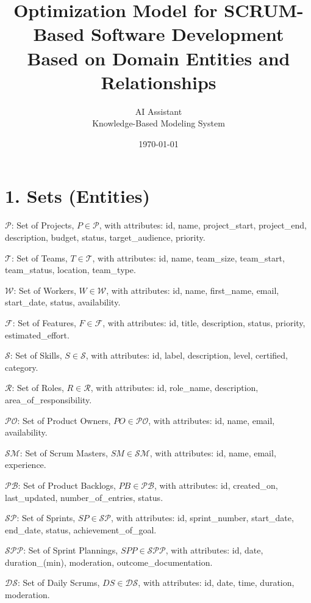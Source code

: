 \documentclass[12pt]{article}
\title{\Huge Optimization Model for SCRUM-Based Software Development \\ \Large Based on Domain Entities and Relationships}
\author{\Large AI Assistant \\ \normalsize Knowledge-Based Modeling System}
\date{\today}
\begin{document}
\maketitle
\tableofcontents
\newpage

\section{1. Sets (Entities)}
\item $ \mathcal{P} $: Set of Projects, $ P \in \mathcal{P} $, with attributes: id, name, project\_start, project\_end, description, budget, status, target\_audience, priority.
    \item $ \mathcal{T} $: Set of Teams, $ T \in \mathcal{T} $, with attributes: id, name, team\_size, team\_start, team\_status, location, team\_type.
    \item $ \mathcal{W} $: Set of Workers, $ W \in \mathcal{W} $, with attributes: id, name, first\_name, email, start\_date, status, availability.
    \item $ \mathcal{F} $: Set of Features, $ F \in \mathcal{F} $, with attributes: id, title, description, status, priority, estimated\_effort.
    \item $ \mathcal{S} $: Set of Skills, $ S \in \mathcal{S} $, with attributes: id, label, description, level, certified, category.
    \item $ \mathcal{R} $: Set of Roles, $ R \in \mathcal{R} $, with attributes: id, role\_name, description, area\_of\_responsibility.
    \item $ \mathcal{PO} $: Set of Product Owners, $ PO \in \mathcal{PO} $, with attributes: id, name, email, availability.
    \item $ \mathcal{SM} $: Set of Scrum Masters, $ SM \in \mathcal{SM} $, with attributes: id, name, email, experience.
    \item $ \mathcal{PB} $: Set of Product Backlogs, $ PB \in \mathcal{PB} $, with attributes: id, created\_on, last\_updated, number\_of\_entries, status.
    \item $ \mathcal{SP} $: Set of Sprints, $ SP \in \mathcal{SP} $, with attributes: id, sprint\_number, start\_date, end\_date, status, achievement\_of\_goal.
    \item $ \mathcal{SPP} $: Set of Sprint Plannings, $ SPP \in \mathcal{SPP} $, with attributes: id, date, duration\_(min), moderation, outcome\_documentation.
    \item $ \mathcal{DS} $: Set of Daily Scrums, $ DS \in \mathcal{DS} $, with attributes: id, date, time, duration, moderation.
\end{document}
